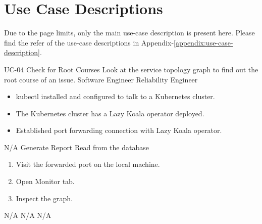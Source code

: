 \newenvironment{CompactItemizes}
{ \vspace{-8mm}\begin{itemize}[leftmargin=*,noitemsep,nolistsep]}
{ \vspace{-7mm}\end{itemize}} 

\newenvironment{CompactEnumerate}
{ \vspace{-8mm}\begin{enumerate}[leftmargin=*,noitemsep,nolistsep]}
{ \vspace{-7mm}\end{enumerate}} 


\section{Use Case Descriptions}
Due to the page limits, only the main use-case description is present here. Please find the refer  of the use-case descriptions in Appendix-\ref{appendix:use-case-description}.

\vspace{-2em}
\UseCaseDescription
{UC-04}
{Check for Root Courses}
{Look at the service topology graph to find out the root course of an issue.}
{Software Engineer\newline
Reliability Engineer}
{\begin{CompactItemizes}
    \item kubectl installed and configured to talk to a Kubernetes cluster.
    \item The Kubernetes cluster has a Lazy Koala operator deployed.
    \item Established port forwarding connection with Lazy Koala operator.
\end{CompactItemizes}}
{N/A}
{Generate Report\newline
Read from the database}
{\begin{CompactEnumerate}
    \item Visit the forwarded port on the local machine.
    \item Open Monitor tab.
    \item Inspect the graph.
\end{CompactEnumerate}}
{{N/A}
{N/A}
{N/A}}


